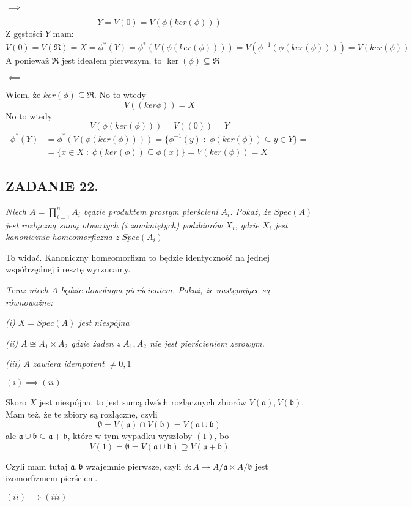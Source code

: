 \documentclass{article}
\begin{document}
$\implies$

$$Y=V(0)=V(\phi(ker(\phi)))$$
Z gęstości $Y$ mam:
$$V(0)=V(\mathfrak{R})=X=\overline{\phi^*(Y)}=\overline{\phi^*(V(\phi(ker(\phi))))}=V(\phi^{-1}(\phi(ker(\phi))))=V(ker(\phi))$$
A ponieważ $\mathfrak{R}$ jest ideałem pierwszym, to $\ker(\phi)\subseteq\mathfrak{R}$

$\impliedby$

Wiem, że $ker(\phi)\subseteq\mathfrak{R}$. No to wtedy
$$V((ker\phi))=X$$
No to wtedy
$$V(\phi(ker(\phi)))=V((0))=Y$$
\begin{align*}
    \phi^*(Y)&=\phi^*(V(\phi(ker(\phi))))=\{\phi^{-1}(y)\;:\;\phi(ker(\phi))\subseteq y\in Y\}=\\
    &=\{x\in X\;:\;\phi(ker(\phi))\subseteq\phi(x)\}=V(ker(\phi))=X
\end{align*}

\subsection*{ZADANIE 22.}
\emph{\color{yellow}Niech $A=\prod\limits_{i=1}^nA_i$ będzie produktem prostym pierścieni $A_i$. Pokaż, że $Spec(A)$ jest rozłączną sumą otwartych (i zamkniętych) podzbiorów $X_i$, gdzie $X_i$ jest kanonicznie homeomorficzna z $Spec(A_i)$}

To widać. Kanoniczny homeomorfizm to będzie identyczność na jednej współrzędnej i resztę wyrzucamy. 

\emph{\color{pink}Teraz niech $A$ będzie dowolnym pierścieniem. Pokaż, że następujące są równoważne:}

\emph{(i) $X=Spec(A)$ jest niespójna}

\emph{(ii) $A\cong A_1\times A_2$ gdzie żaden z $A_1,A_2$ nie jest pierścieniem zerowym.}

\emph{(iii) $A$ zawiera idempotent $\neq0,1$}
\medskip

$(i)\implies (ii)$

Skoro $X$ jest niespójna, to jest sumą dwóch rozłącznych zbiorów $V(\mathfrak{a}), V(\mathfrak{b})$.  Mam też, że te zbiory są rozłączne, czyli
$$\emptyset=V(\mathfrak{a})\cap V(\mathfrak{b})=V(\mathfrak{a}\cup\mathfrak{b})$$
ale $\mathfrak{a}\cup\mathfrak{b}\subseteq\mathfrak{a}+\mathfrak{b}$, które w tym wypadku wyszłoby $(1)$, bo
$$V(1)=\emptyset=V(\mathfrak{a}\cup\mathfrak{b})\supseteq V(\mathfrak{a}+\mathfrak{b})$$

Czyli mam tutaj $\mathfrak{a},\mathfrak{b}$ wzajemnie pierwsze, czyli $\phi:A\to A/\mathfrak{a}\times A/\mathfrak{b}$ jest izomorfizmem pierścieni.

$(ii)\implies (iii)$
\end{document}
